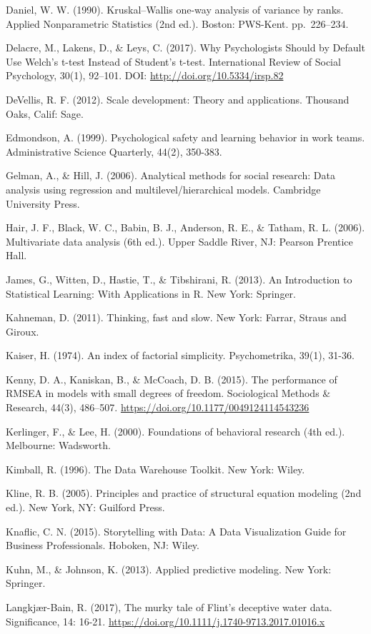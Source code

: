 \documentclass[
]{book}
\begin{document}
Daniel, W. W. (1990). Kruskal--Wallis one-way analysis of variance by ranks. Applied Nonparametric Statistics (2nd ed.). Boston: PWS-Kent. pp.~226--234.

Delacre, M., Lakens, D., \& Leys, C. (2017). Why Psychologists Should by Default Use Welch's t-test Instead of Student's t-test. International Review of Social Psychology, 30(1), 92--101. DOI: \url{http://doi.org/10.5334/irsp.82}

DeVellis, R. F. (2012). Scale development: Theory and applications. Thousand Oaks, Calif: Sage.

Edmondson, A. (1999). Psychological safety and learning behavior in work teams. Administrative Science Quarterly, 44(2), 350-383.

Gelman, A., \& Hill, J. (2006). Analytical methods for social research: Data analysis using regression and multilevel/hierarchical models. Cambridge University Press.

Hair, J. F., Black, W. C., Babin, B. J., Anderson, R. E., \& Tatham, R. L. (2006). Multivariate data analysis (6th ed.). Upper Saddle River, NJ: Pearson Prentice Hall.

James, G., Witten, D., Hastie, T., \& Tibshirani, R. (2013). An Introduction to Statistical Learning: With Applications in R. New York: Springer.

Kahneman, D. (2011). Thinking, fast and slow. New York: Farrar, Straus and Giroux.

Kaiser, H. (1974). An index of factorial simplicity. Psychometrika, 39(1), 31-36.

Kenny, D. A., Kaniskan, B., \& McCoach, D. B. (2015). The performance of RMSEA in models with small degrees of freedom. Sociological Methods \& Research, 44(3), 486--507. \url{https://doi.org/10.1177/0049124114543236}

Kerlinger, F., \& Lee, H. (2000). Foundations of behavioral research (4th ed.). Melbourne: Wadsworth.

Kimball, R. (1996). The Data Warehouse Toolkit. New York: Wiley.

Kline, R. B. (2005). Principles and practice of structural equation modeling (2nd ed.). New York, NY: Guilford Press.

Knaflic, C. N. (2015). Storytelling with Data: A Data Visualization Guide for Business Professionals. Hoboken, NJ: Wiley.

Kuhn, M., \& Johnson, K. (2013). Applied predictive modeling. New York: Springer.

Langkjær-Bain, R. (2017), The murky tale of Flint's deceptive water data. Significance, 14: 16-21. \url{https://doi.org/10.1111/j.1740-9713.2017.01016.x}
\end{document}
